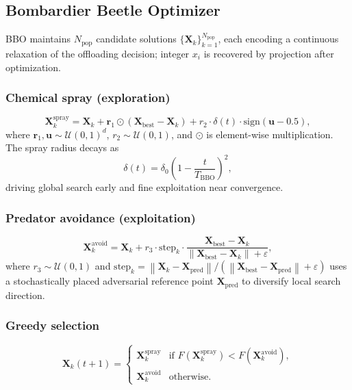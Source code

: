 \documentclass[journal]{IEEEtran}
\newcommand{\vect}[1]{\mathbf{#1}}
\newcommand{\norm}[1]{\left\|#1\right\|}
\begin{document}
\subsection{Bombardier Beetle Optimizer}
\label{subsec:bbo}

BBO maintains $N_{\mathrm{pop}}$ candidate solutions
$\{\vect{X}_k\}_{k=1}^{N_{\mathrm{pop}}}$, each encoding a
continuous relaxation of the offloading decision; integer $x_i$ is
recovered by projection after optimization.

\subsubsection{Chemical spray (exploration)}
\begin{equation}
  \vect{X}^{\mathrm{spray}}_k =
    \vect{X}_k
    + \vect{r}_1 \odot (\vect{X}_{\mathrm{best}} - \vect{X}_k)
    + r_2 \cdot \delta(t) \cdot \mathrm{sign}(\vect{u} - 0.5),
  \label{eq:bbo_spray}
\end{equation}
where $\vect{r}_1, \vect{u} \sim \mathcal{U}(0,1)^d$, $r_2 \sim
\mathcal{U}(0,1)$, and $\odot$ is element-wise multiplication. The
spray radius decays as
\begin{equation}
  \delta(t) = \delta_0 \left(1 - \frac{t}{T_{\mathrm{BBO}}}\right)^{\!2},
  \label{eq:delta_decay}
\end{equation}
driving global search early and fine exploitation near convergence.

\subsubsection{Predator avoidance (exploitation)}
\begin{equation}
  \vect{X}^{\mathrm{avoid}}_k =
    \vect{X}_k
    + r_3 \cdot \mathrm{step}_k
      \cdot \frac{\vect{X}_{\mathrm{best}} - \vect{X}_k}
                 {\norm{\vect{X}_{\mathrm{best}} - \vect{X}_k} + \varepsilon},
  \label{eq:bbo_avoid}
\end{equation}
where $r_3 \sim \mathcal{U}(0,1)$ and
$\mathrm{step}_k =
  \norm{\vect{X}_k - \vect{X}_{\mathrm{pred}}} /
  (\norm{\vect{X}_{\mathrm{best}} - \vect{X}_{\mathrm{pred}}} + \varepsilon)$
uses a stochastically placed adversarial reference point
$\vect{X}_{\mathrm{pred}}$ to diversify local search direction.

\subsubsection{Greedy selection}
\begin{equation}
  \vect{X}_k(t+1) =
  \begin{cases}
    \vect{X}^{\mathrm{spray}}_k & \text{if } F(\vect{X}^{\mathrm{spray}}_k)
                                   < F(\vect{X}^{\mathrm{avoid}}_k), \\[3pt]
    \vect{X}^{\mathrm{avoid}}_k & \text{otherwise.}
  \end{cases}
  \label{eq:bbo_selection}
\end{equation}
\end{document}
